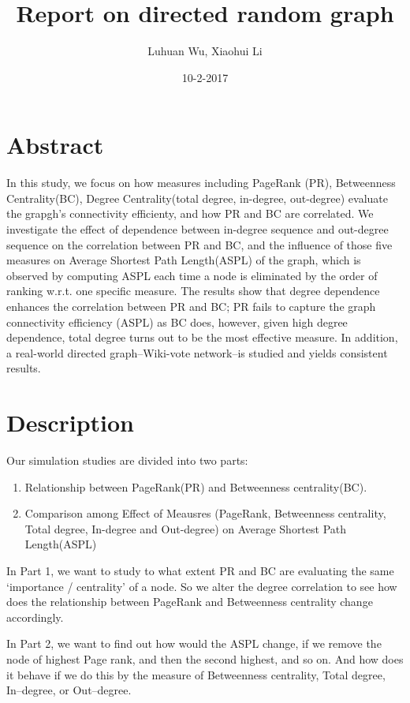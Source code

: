 \documentclass{article}
\title{Report on directed random graph}
\author{\vspace{-6ex} Luhuan Wu, Xiaohui Li}
\date{10-2-2017}
\begin{document}
\maketitle

\section{Abstract}
In this study, we focus on how measures including PageRank (PR), Betweenness Centrality(BC), Degree Centrality(total degree, in-degree, out-degree) evaluate the grapgh's connectivity efficienty, and how PR and BC are correlated. We investigate the effect of dependence between in-degree sequence and out-degree sequence on the correlation between PR and BC, and the influence of those five measures on Average Shortest Path Length(ASPL) of the graph, which is observed by computing ASPL each time a node is eliminated by the order of ranking w.r.t. one specific measure. The results show that degree dependence enhances the correlation between PR and BC; PR fails to capture the graph connectivity efficiency (ASPL) as BC does, however, given high degree dependence, total degree turns out to be the most effective measure. In addition, a real-world directed graph--Wiki-vote network--is studied and yields consistent results.

\section{Description}
Our simulation studies are divided into two parts:
\begin{enumerate}
\item Relationship between PageRank(PR) and Betweenness centrality(BC).
\item Comparison among Effect of Meausres (PageRank, Betweenness centrality, Total degree, In-degree and Out-degree) on Average Shortest Path Length(ASPL)
\end{enumerate}
\par In Part 1, we want to study to what extent PR and BC are evaluating the same `importance / centrality' of a node. So we alter the degree correlation to see how does the relationship between PageRank and Betweenness centrality change accordingly.
\par In Part 2, we want to find out how would the ASPL change, if we remove the node of highest Page rank, and then the second highest, and so on. And how does it behave if we do this by the measure of Betweenness centrality,  Total degree,  In--degree, or Out--degree.  \\
\end{document}
